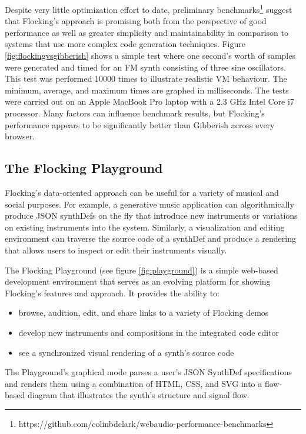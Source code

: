 \documentclass{article}
\begin{document}
Despite very little optimization effort to date, preliminary benchmarks\footnote{https://github.com/colinbdclark/webaudio-performance-benchmarks} suggest that Flocking's approach is promising both from the perspective of good performance as well as greater simplicity and maintainability in comparison to systems that use more complex code generation techniques. Figure \ref{fig:flockingvsgibberish} shows a simple test where one second's worth of samples were generated and timed for an FM synth consisting of three sine oscillators. This test was performed 10000 times to illustrate realistic VM behaviour. The minimum, average, and maximum times are graphed in milliseconds. The tests were carried out on an Apple MacBook Pro laptop with a 2.3 GHz Intel Core i7 processor. Many factors can influence benchmark results, but Flocking's performance appears to be significantly better than Gibberish across every browser.

\subsection{The Flocking Playground}

Flocking's data-oriented approach can be useful for a variety of musical and social purposes. For example, a generative music application can algorithmically produce JSON synthDefs on the fly that introduce new instruments or variations on existing instruments into the system. Similarly, a visualization and editing environment can traverse the source code of a synthDef and produce a rendering that allows users to inspect or edit their instruments visually.

The Flocking Playground (see figure \ref{fig:playground}) is a simple web-based development environment that serves as an evolving platform for showing Flocking's features and approach. It provides the ability to:

\begin{itemize}
\item browse, audition, edit, and share links to a variety of Flocking demos
\item develop new instruments and compositions in the integrated code editor
\item see a synchronized visual rendering of a synth's source code
\end{itemize}

The Playground's graphical mode parses a user's JSON SynthDef specifications and renders them using a combination of HTML, CSS, and SVG into a flow-based diagram that illustrates the synth's structure and signal flow.
\end{document}
